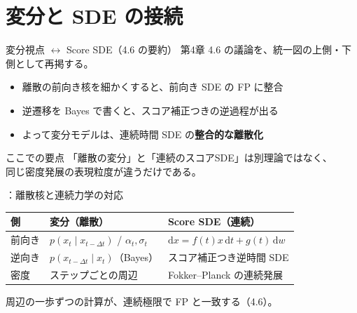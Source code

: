 \section{変分と SDE の接続}
\asmain
\begin{frame}{変分視点 $\leftrightarrow$ Score SDE（4.6 の要約）}
    第4章 4.6 の議論を、統一図の上側・下側として再掲する。
    \begin{itemize}
        \item 離散の前向き核を細かくすると、前向き SDE の FP に整合
        \item 逆遷移を Bayes で書くと、スコア補正つきの逆過程が出る
        \item よって変分モデルは、連続時間 SDE の\textbf{整合的な離散化}
    \end{itemize}
    \begin{exampleblock}{ここでの要点}
        「離散の変分」と「連続のスコアSDE」は別理論ではなく、\\
        同じ密度発展の表現粒度が違うだけである。
    \end{exampleblock}
\end{frame}
\assuppl
\begin{frame}{\supplmark：離散核と連続力学の対応}
    \centering
    \renewcommand{\arraystretch}{1.35}
    \footnotesize
    \begin{tabular}{lll}
        \textbf{側} & \textbf{変分（離散）} & \textbf{Score SDE（連続）} \\
        \hline
        前向き
        & $p(x_t\mid x_{t-\Delta t})$ / $\alpha_t,\sigma_t$
        & $\mathrm{d}x=f(t)x\,\mathrm{d}t+g(t)\,\mathrm{d}w$
        \\
        逆向き
        & $p(x_{t-\Delta t}\mid x_t)$（Bayes）
        & スコア補正つき逆時間 SDE
        \\
        密度
        & ステップごとの周辺
        & Fokker--Planck の連続発展
        \\
    \end{tabular}
    \normalsize
    \vfill
    周辺の一歩ずつの計算が、連続極限で FP と一致する（4.6）。
\end{frame}
